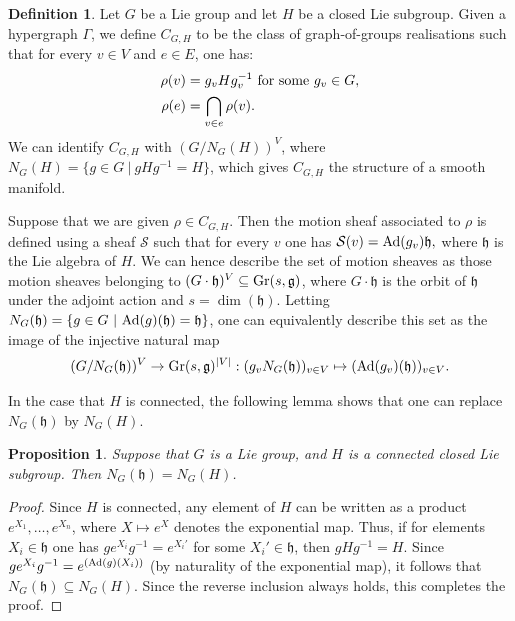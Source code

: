 \documentclass{article}
\newtheorem{proposition}[theorem]{Proposition}
\theoremstyle{definition}
\newtheorem{definition}[theorem]{Definition}
\theoremstyle{remark}
\begin{document}
\begin{definition}
    Let $G$ be a Lie group and let $H$ be a closed Lie subgroup. Given a hypergraph $\Gamma$, we define $C_{G, H}$ to be the class of graph-of-groups realisations such that for every $v\in V$ and $e\in E$, one has:
    \begin{align*}
        \rho(v) & = g_{v} H g_{v}^{-1} \textup{ for some } g_{v} \in G,\\
        \rho(e) & = \bigcap_{v\in e} \rho(v).
    \end{align*}
    We can identify $C_{G, H}$ with $(G/N_{G}(H))^{V}$, where $N_{G}(H) = \{g \in G~\vert~ gHg^{-1} = H\}$, which gives $C_{G, H}$ the structure of a smooth manifold.
\end{definition}

Suppose that we are given $\rho \in C_{G, H}$. Then the motion sheaf associated to $\rho$ is defined using a sheaf $\mathcal{S}$ such that for every $v$ one has 
$\mathcal{S}(v) = \textup{Ad}(g_{v})\mathfrak{h},$
where $\mathfrak{h}$ is the Lie algebra of $H$. We can hence describe the set of motion sheaves as those motion sheaves belonging to $(G \cdot  \mathfrak{h})^{V} \subseteq \textup{Gr}( s , \mathfrak{g})$, where $G \cdot \mathfrak{h}$ is the orbit of $\mathfrak{h}$ under the adjoint action and $s= \dim(\mathfrak{h})$. Letting $N_{G}(\mathfrak{h}) = \{g\in G~\vert~ \textup{Ad}(g)(\mathfrak{h}) = \mathfrak{h} \}$, one can equivalently describe this set as the image of the injective natural map
\begin{align*}
    (G/N_{G}(\mathfrak{h}))^{V} \rightarrow \textup{Gr}(s, \mathfrak{g})^{|V|}: (g_{v}N_{G}(\mathfrak{h}))_{v\in V} \mapsto  (\textup{Ad}(g_{v})(\mathfrak{h}))_{v \in V}.
\end{align*}

In the case that $H$ is connected, the following lemma shows that one can replace $N_{G}(\mathfrak{h})$ by $N_{G}(H)$.
\begin{proposition}\label{lem: lie-alg-lie-group-norm}
    Suppose that $G$ is a Lie group, and $H$ is a connected closed Lie subgroup. Then $N_G(\mathfrak{h}) = N_G(H)$.
\end{proposition}
\begin{proof}
Since $H$ is connected, any element of $H$ can be written as a product $e^{X_1},\dots, e^{X_n}$, where $X\mapsto e^{X}$ denotes the exponential map. Thus, if for elements $X_i \in \mathfrak{h}$ one has $ge^{X_i}g^{-1}=e^{X_i'}$ for some $X_i'\in \mathfrak{h}$, then $gHg^{-1} = H$. Since $ge^{X_i}g^{-1} = e^{(\textup{Ad}(g)(X_i))}$ (by naturality of the exponential map), it follows that $N_G(\mathfrak{h}) \subseteq N_G(H)$. Since the reverse inclusion always holds, this completes the proof.
\end{proof}
\end{document}
